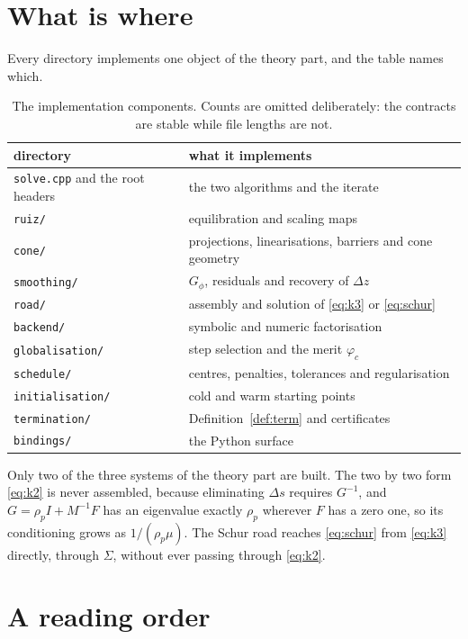 \documentclass[a4paper,11pt]{book}
\theoremstyle{plain}
\theoremstyle{definition}
\theoremstyle{remark}
\numberwithin{equation}{chapter}
\numberwithin{algorithm}{chapter}
\begin{document}
	\section{What is where}

	Every directory implements one object of the theory part, and the table names
	which.

	\begin{table}[H]
		\centering\small
		\begin{tabular}{ll}
			\toprule
			directory & what it implements\\
			\midrule
			\texttt{solve.cpp} and the root headers
			& the two algorithms and the iterate\\
			\texttt{ruiz/} & equilibration and scaling maps\\
			\texttt{cone/} & projections, linearisations, barriers and cone geometry\\
			\texttt{smoothing/} & $G_\phi$, residuals and recovery of $\Delta z$\\
			\texttt{road/} & assembly and solution of \eqref{eq:k3} or \eqref{eq:schur}\\
			\texttt{backend/} & symbolic and numeric factorisation\\
			\texttt{globalisation/} & step selection and the merit $\varphi_c$\\
			\texttt{schedule/} & centres, penalties, tolerances and regularisation\\
			\texttt{initialisation/} & cold and warm starting points\\
			\texttt{termination/} & Definition~\ref{def:term} and certificates\\
			\texttt{bindings/} & the Python surface\\
			\bottomrule
		\end{tabular}
		\caption{The implementation components. Counts are omitted deliberately:
			the contracts are stable while file lengths are not.}
	\end{table}

	Only two of the three systems of the theory part are built. The two by two
	form \eqref{eq:k2} is never assembled, because eliminating $\Delta s$ requires
	$G^{-1}$, and $G=\rho_pI+M^{-1}F$ has an eigenvalue exactly $\rho_p$ wherever
	$F$ has a zero one, so its conditioning grows as $1/(\rho_p\mu)$. The Schur
	road reaches \eqref{eq:schur} from \eqref{eq:k3} directly, through $\Sigma$,
	without ever passing through \eqref{eq:k2}.

	\section{A reading order}
\end{document}
